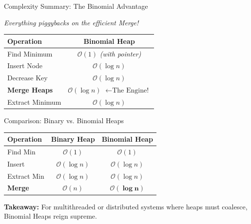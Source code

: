 \documentclass[11pt, aspectratio=169]{beamer}
\begin{document}
\begin{frame}{Complexity Summary: The Binomial Advantage}
    \begin{center}
        \large \textit{Everything piggybacks on the efficient Merge!}
        
        \vspace{0.1cm}
        \renewcommand{\arraystretch}{1.3}
        \begin{tabular}{lc}
            \toprule
            \textbf{Operation} & \textbf{Binomial Heap} \\
            \midrule
            Find Minimum   & $\mathcal{O}(1)$ \small{\textit{(with pointer)}} \\
            Insert Node    & $\mathcal{O}(\log n)$ \\
            Decrease Key   & $\mathcal{O}(\log n)$ \\
            \textbf{Merge Heaps}    & \textbf{$\mathcal{O}(\log n)$} \quad $\leftarrow \text{The Engine!}$ \\
            Extract Minimum& $\mathcal{O}(\log n)$ \\
            \bottomrule
        \end{tabular}
    \end{center}
\end{frame}

\begin{frame}{Comparison: Binary vs. Binomial Heaps}
    \begin{center}
        \renewcommand{\arraystretch}{1.3}
        \begin{tabular}{lcc}
            \toprule
            \textbf{Operation} & \textbf{Binary Heap} & \textbf{Binomial Heap} \\
            \midrule
            Find Min   & $\mathcal{O}(1)$ & $\mathcal{O}(1)$ \\
            Insert     & $\mathcal{O}(\log n)$ & $\mathcal{O}(\log n)$ \\
            Extract Min& $\mathcal{O}(\log n)$ & $\mathcal{O}(\log n)$ \\
            \rowcolor{accent!20}
            \textbf{Merge}      & $\mathcal{O}(n)$ & $\mathbf{\mathcal{O}(\log n)}$ \\
            \bottomrule
        \end{tabular}
    \end{center}
    
    \vspace{0.2cm}
    \textbf{Takeaway:} For multithreaded or distributed systems where heaps must coalesce, Binomial Heaps reign supreme.
\end{frame}
\end{document}
